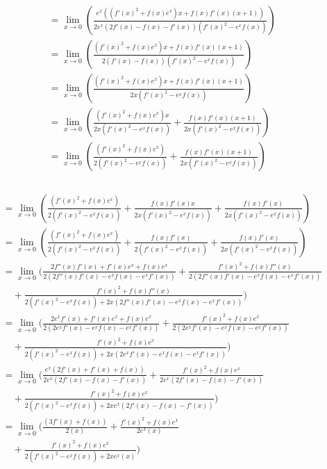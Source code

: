\documentclass{article}
\begin{document}
\begin{enumerate}[label=\alph*.)]
\begin{align*}
&= \lim_{x \rightarrow 0}(\frac{e^x((f'(x)^2 + f(x)e^x)x + f(x)f'(x)(x + 1))}{2e^x(2f'(x) - f(x) - f'(x))(f'(x)^2 - e^xf(x))})\\
&= \lim_{x \rightarrow 0}(\frac{(f'(x)^2 + f(x)e^x)x + f(x)f'(x)(x + 1)}{2(f'(x) - f(x))(f'(x)^2 - e^xf(x))})\\
&= \lim_{x \rightarrow 0}(\frac{(f'(x)^2 + f(x)e^x)x + f(x)f'(x)(x + 1)}{2x(f'(x)^2 - e^xf(x))})\\
&= \lim_{x \rightarrow 0}(\frac{(f'(x)^2 + f(x)e^x)x}{2x(f'(x)^2 - e^xf(x))} + \frac{f(x)f'(x)(x + 1)}{2x(f'(x)^2 - e^xf(x))})\\
&= \lim_{x \rightarrow 0}(\frac{(f'(x)^2 + f(x)e^x)}{2(f'(x)^2 - e^xf(x))} + \frac{f(x)f'(x)(x + 1)}{2x(f'(x)^2 - e^xf(x))})\\
\end{align*}\\
\begin{align*}
&= \lim_{x \rightarrow 0}(\frac{(f'(x)^2 + f(x)e^x)}{2(f'(x)^2 - e^xf(x))} + \frac{f(x)f'(x)x}{2x(f'(x)^2 - e^xf(x))} +\frac{f(x)f'(x)}{2x(f'(x)^2 - e^xf(x))} )\\
&= \lim_{x \rightarrow 0}(\frac{(f'(x)^2 + f(x)e^x)}{2(f'(x)^2 - e^xf(x))} + \frac{f(x)f'(x)}{2(f'(x)^2 - e^xf(x))} +\frac{f(x)f'(x)}{2x(f'(x)^2 - e^xf(x))} )\\
&= \lim_{x \rightarrow 0}(\frac{2f''(x)f'(x) + f'(x)e^x + f(x)e^x}{2(2f''(x)f'(x) - e^xf(x) - e^xf'(x))} + \frac{f'(x)^2 + f(x)f''(x)}{2(2f''(x)f'(x) - e^xf(x) - e^xf'(x))} \\
&\quad +\frac{f'(x)^2 + f(x)f''(x)}{2(f'(x)^2 -e^xf(x)) + 2x(2f''(x)f'(x) - e^xf(x) - e^xf'(x))} )\\
&= \lim_{x \rightarrow 0}(\frac{2e^xf'(x) + f'(x)e^x + f(x)e^x}{2(2e^xf'(x) - e^xf(x) - e^xf'(x))} + \frac{f'(x)^2 + f(x)e^x}{2(2e^xf'(x) - e^xf(x) - e^xf'(x))} \\
&\quad +\frac{f'(x)^2 + f(x)e^x}{2(f'(x)^2 -e^xf(x)) + 2x(2e^xf'(x) - e^xf(x) - e^xf'(x))} )\\
&= \lim_{x \rightarrow 0}(\frac{e^{x}(2f'(x) + f'(x) + f(x))}{2e^x(2f'(x) - f(x) - f'(x))} + \frac{f'(x)^2 + f(x)e^x}{2e^x(2f'(x) - f(x) - f'(x))} \\
&\quad +\frac{f'(x)^2 + f(x)e^x}{2(f'(x)^2 -e^xf(x)) + 2xe^x(2f'(x) - f(x) - f'(x))} )\\
&= \lim_{x \rightarrow 0}(\frac{(3f'(x) + f(x))}{2(x)} + \frac{f'(x)^2 + f(x)e^x}{2e^x(x)} \\
&\quad +\frac{f'(x)^2 + f(x)e^x}{2(f'(x)^2 -e^xf(x)) + 2xe^x(x)} )\\

\end{align*}
\end{enumerate}
\end{document}

